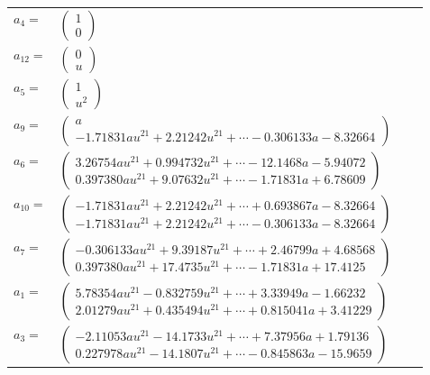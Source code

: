 \documentclass[1p]{elsarticle_modified}
\theoremstyle{definition}
\begin{document}
\begin{tabular}{m{7pt} m{180pt} m{7pt} m{180pt} }
\flushright $a_{4}=$&$\begin{pmatrix}1\\0\end{pmatrix}$ \\
\flushright $a_{12}=$&$\begin{pmatrix}0\\u\end{pmatrix}$ \\
\flushright $a_{5}=$&$\begin{pmatrix}1\\u^2\end{pmatrix}$ \\
\flushright $a_{9}=$&$\begin{pmatrix}a\\-1.71831 a u^{21}+2.21242 u^{21}+\cdots-0.306133 a-8.32664\end{pmatrix}$ \\
\flushright $a_{6}=$&$\begin{pmatrix}3.26754 a u^{21}+0.994732 u^{21}+\cdots-12.1468 a-5.94072\\0.397380 a u^{21}+9.07632 u^{21}+\cdots-1.71831 a+6.78609\end{pmatrix}$ \\
\flushright $a_{10}=$&$\begin{pmatrix}-1.71831 a u^{21}+2.21242 u^{21}+\cdots+0.693867 a-8.32664\\-1.71831 a u^{21}+2.21242 u^{21}+\cdots-0.306133 a-8.32664\end{pmatrix}$ \\
\flushright $a_{7}=$&$\begin{pmatrix}-0.306133 a u^{21}+9.39187 u^{21}+\cdots+2.46799 a+4.68568\\0.397380 a u^{21}+17.4735 u^{21}+\cdots-1.71831 a+17.4125\end{pmatrix}$ \\
\flushright $a_{1}=$&$\begin{pmatrix}5.78354 a u^{21}-0.832759 u^{21}+\cdots+3.33949 a-1.66232\\2.01279 a u^{21}+0.435494 u^{21}+\cdots+0.815041 a+3.41229\end{pmatrix}$ \\
\flushright $a_{3}=$&$\begin{pmatrix}-2.11053 a u^{21}-14.1733 u^{21}+\cdots+7.37956 a+1.79136\\0.227978 a u^{21}-14.1807 u^{21}+\cdots-0.845863 a-15.9659\end{pmatrix}$ \\

\end{tabular}
\end{document}

